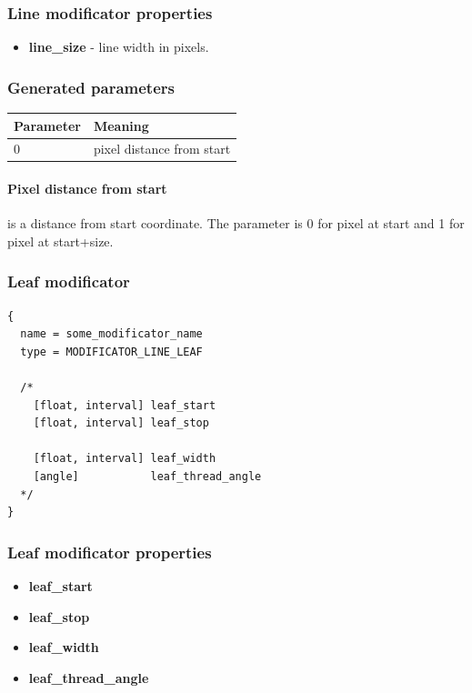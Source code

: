 \documentclass[9pt]{article}
\begin{document}
\subsubsection*{Line modificator properties}
\begin{itemize}
\item{\bf line\_size} - line width in pixels.
\end{itemize}

\subsubsection*{Generated parameters}

\begin{tabular}{|l||l|}
\hline
  Parameter & Meaning \\
\hline
  0 & pixel distance from start \\
\hline
\end{tabular}

\paragraph*{Pixel distance from start} is a distance from start coordinate. 
The parameter is 0 for pixel at start and 1 for pixel at start+size.

\subsubsection{Leaf modificator}

\begin{verbatim}
{
  name = some_modificator_name
  type = MODIFICATOR_LINE_LEAF

  /*
    [float, interval] leaf_start
    [float, interval] leaf_stop
  
    [float, interval] leaf_width
    [angle]           leaf_thread_angle
  */
}
\end{verbatim}
\subsubsection*{Leaf modificator properties}
\begin{itemize}
\item{\bf leaf\_start}
\item{\bf leaf\_stop}
\item{\bf leaf\_width}
\item{\bf leaf\_thread\_angle}
\end{itemize}
\end{document}
